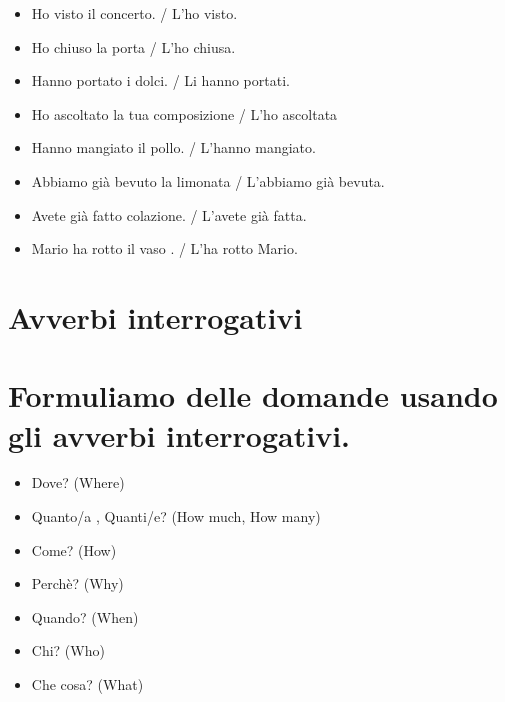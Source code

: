 \documentclass[letter,11pt]{article}
\begin{document}
\vskip 0.5in

\begin{multicols}{2}
\begin{itemize}
    \item Ho visto il concerto. / L'ho visto.
    \item Ho chiuso la porta / L'ho chiusa.
    \item Hanno portato i dolci. / Li hanno portati.
    \item Ho ascoltato la tua composizione / L'ho ascoltata
    \item Hanno mangiato il pollo. / L'hanno mangiato.
    \item Abbiamo già bevuto la limonata /   L'abbiamo già bevuta.
    \item Avete già fatto colazione. / L'avete già fatta.
    \item Mario ha rotto il vaso . / L'ha rotto Mario.



\end{itemize}
\end{multicols}


\vskip 0.2in

\section*{Avverbi interrogativi}
\section*{Formuliamo delle domande usando gli avverbi interrogativi.}
\vskip 0.2in

\begin{multicols}{2}
\begin{itemize}

    \item Dove? (Where)
    \item Quanto/a , Quanti/e? (How much, How many)
    \item Come? (How)
    \item Perchè? (Why)
    \item Quando? (When)
    \item Chi? (Who)
    \item Che cosa? (What)

\end{itemize}
\end{multicols}
\end{document}
